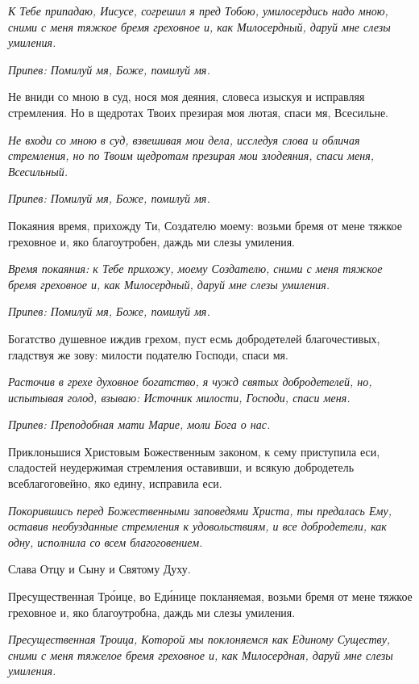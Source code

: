 \itshape К Тебе припадаю, Иисусе, согрешил я пред Тобою, умилосердись надо мною, сними с меня тяжкое бремя греховное и, как Милосердный, даруй мне слезы умиления.\normalfont{}


\itshape Припев:\normalfont{} Помилуй мя, Боже, помилуй мя.


Не вниди со мною в суд, нося моя деяния, словеса изыскуя и исправляя стремления. Но в щедротах Твоих презирая моя лютая, спаси мя, Всесильне.


\itshape Не входи со мною в суд, взвешивая мои дела, исследуя слова и обличая стремления, но по Твоим щедротам презирая мои злодеяния, спаси меня, Всесильный.\normalfont{}


\itshape Припев:\normalfont{} Помилуй мя, Боже, помилуй мя.


Покаяния время, прихожду Ти, Создателю моему: возьми бремя от мене тяжкое греховное и, яко благоутробен, даждь ми слезы умиления.


\itshape Время покаяния: к Тебе прихожу, моему Создателю, сними с меня тяжкое бремя греховное и, как Милосердный, даруй мне слезы умиления.\normalfont{}


\itshape Припев:\normalfont{} Помилуй мя, Боже, помилуй мя.


Богатство душевное иждив грехом, пуст есмь добродетелей благочестивых, гладствуя же зову: милости подателю Господи, спаси мя.


\itshape Расточив в грехе духовное богатство, я чужд святых добродетелей, но, испытывая голод, взываю: Источник милости, Господи, спаси меня.\normalfont{}


\itshape Припев:\normalfont{} Преподобная мати Марие, моли Бога о нас.


Приклоньшися Христовым Божественным законом, к сему приступила еси, сладостей неудержимая стремления оставивши, и всякую добродетель всеблагоговейно, яко едину, исправила еси.


\itshape Покорившись перед Божественными заповедями Христа, ты предалась Ему, оставив необузданные стремления к удовольствиям, и все добродетели, как одну, исполнила со всем благоговением.\normalfont{}


Слава Отцу и Сыну и Святому Духу.


Пресущественная Тро́ице, во Еди́нице покланяемая, возьми бремя от мене тяжкое греховное и, яко благоутробна, даждь ми слезы умиления.


\itshape Пресущественная Троица, Которой мы поклоняемся как Единому Существу, сними с меня тяжелое бремя греховное и, как Милосердная, даруй мне слезы умиления.\normalfont{}


